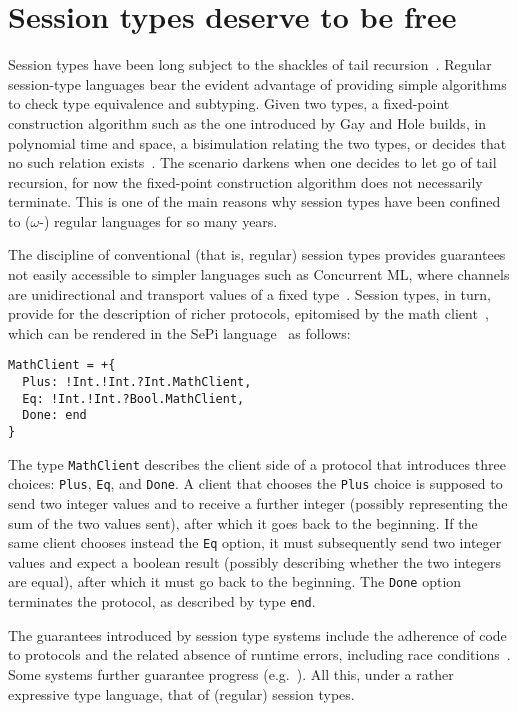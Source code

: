 \section{Session types deserve to be free}

Session types have been long subject to the shackles of tail
recursion~\cite{DBLP:conf/concur/Honda93,DBLP:conf/esop/HondaVK98}. Regular
session-type languages bear the evident advantage of providing simple
algorithms to check type equivalence and subtyping. Given two types, a
fixed-point construction algorithm such as the one introduced by Gay
and Hole builds, in polynomial time and space, a bisimulation relating
the two types, or decides that no such relation
exists~\cite{DBLP:journals/acta/GayH05}. The scenario darkens when one
decides to let go of tail recursion, for now the fixed-point
construction algorithm does not necessarily terminate.
%
This is one of the main reasons why session types have been confined
to ($\omega$-) regular languages for so many years.

The discipline of conventional (that is, regular) session types
provides guarantees not easily accessible to simpler languages such as
Concurrent ML, where channels are unidirectional and transport values
of a fixed type~\cite{DBLP:conf/mcmaster/Reppy93}. Session types, in
turn, provide for the description of richer protocols, epitomised by
the math client~\cite{DBLP:journals/acta/GayH05}, which can be
rendered in the SePi language~\cite{DBLP:conf/sefm/FrancoV13} as
follows:
%
\begin{lstlisting}[morekeywords=end]
MathClient = +{
  Plus: !Int.!Int.?Int.MathClient,
  Eq: !Int.!Int.?Bool.MathClient,
  Done: end
}
\end{lstlisting}

The type \lstinline|MathClient| describes the client side of a
protocol that introduces three choices: \lstinline|Plus|,
\lstinline|Eq|, and \lstinline|Done|. A client that chooses the
\lstinline|Plus| choice is supposed to send two integer values and to
receive a further integer (possibly representing the sum of the two
values sent), after which it goes back to the beginning. If the same
client chooses instead the \lstinline|Eq| option, it must subsequently
send two integer values and expect a boolean result (possibly
describing whether the two integers are equal), after which it must go
back to the beginning.  The \lstinline|Done| option terminates the
protocol, as described by type \lstinline[morekeywords=end]|end|.

The guarantees introduced by session type systems include the
adherence of code to protocols and the related absence of runtime
errors, including race
conditions~\cite{DBLP:conf/esop/HondaVK98}. Some systems further
guarantee progress (e.g.~\cite{DBLP:conf/concur/CairesP10}). All this,
under a rather expressive type language, that of (regular) session
types.

